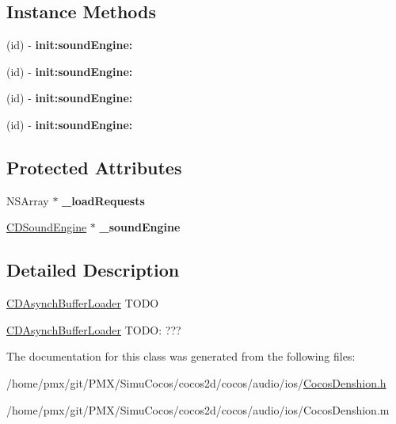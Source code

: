 \subsection*{Instance Methods}
\begin{DoxyCompactItemize}
\item 
\mbox{\label{interfaceCDAsynchBufferLoader_a32648b723ada6ab22a2b4e6496e4be1a}} 
(id) -\/ {\bfseries init\+:sound\+Engine\+:}
\item 
\mbox{\label{interfaceCDAsynchBufferLoader_a32648b723ada6ab22a2b4e6496e4be1a}} 
(id) -\/ {\bfseries init\+:sound\+Engine\+:}
\item 
\mbox{\label{interfaceCDAsynchBufferLoader_a32648b723ada6ab22a2b4e6496e4be1a}} 
(id) -\/ {\bfseries init\+:sound\+Engine\+:}
\item 
\mbox{\label{interfaceCDAsynchBufferLoader_a32648b723ada6ab22a2b4e6496e4be1a}} 
(id) -\/ {\bfseries init\+:sound\+Engine\+:}
\end{DoxyCompactItemize}
\subsection*{Protected Attributes}
\begin{DoxyCompactItemize}
\item 
\mbox{\label{interfaceCDAsynchBufferLoader_a17336b533c9277c4900fbc2a4691c23c}} 
N\+S\+Array $\ast$ {\bfseries \+\_\+load\+Requests}
\item 
\mbox{\label{interfaceCDAsynchBufferLoader_ae6dfcd1ee99109b7caeb43b48c6e207b}} 
\hyperlink{interfaceCDSoundEngine}{C\+D\+Sound\+Engine} $\ast$ {\bfseries \+\_\+sound\+Engine}
\end{DoxyCompactItemize}


\subsection{Detailed Description}
\hyperlink{interfaceCDAsynchBufferLoader}{C\+D\+Asynch\+Buffer\+Loader} T\+O\+DO

\hyperlink{interfaceCDAsynchBufferLoader}{C\+D\+Asynch\+Buffer\+Loader} T\+O\+DO\+: ??? 

The documentation for this class was generated from the following files\+:\begin{DoxyCompactItemize}
\item 
/home/pmx/git/\+P\+M\+X/\+Simu\+Cocos/cocos2d/cocos/audio/ios/\hyperlink{cocos2d_2cocos_2audio_2ios_2CocosDenshion_8h}{Cocos\+Denshion.\+h}\item 
/home/pmx/git/\+P\+M\+X/\+Simu\+Cocos/cocos2d/cocos/audio/ios/Cocos\+Denshion.\+m\end{DoxyCompactItemize}
